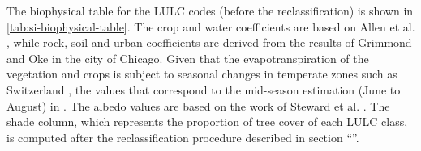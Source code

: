 \documentclass[10pt,letterpaper]{article}
\begin{document}
The biophysical table for the LULC codes (before the reclassification) is shown in \autoref{tab:si-biophysical-table}. The crop and water coefficients are based on Allen et al. \cite{allen1998crop}, while rock, soil and urban coefficients are derived from the results of Grimmond and Oke \cite{grimmond1999evapotranspiration} in the city of Chicago. Given that the evapotranspiration of the vegetation and crops is subject to seasonal changes in temperate zones such as Switzerland \cite{allen1998crop}, the values that correspond to the mid-season estimation (June to August) in \cite{nistor2016mapping}.
The albedo values are based on the work of Steward et al. \cite{stewart2012local}.
The shade column, which represents the proportion of tree cover of each LULC class, is computed after the reclassification procedure described in section ``''. %
\end{document}
